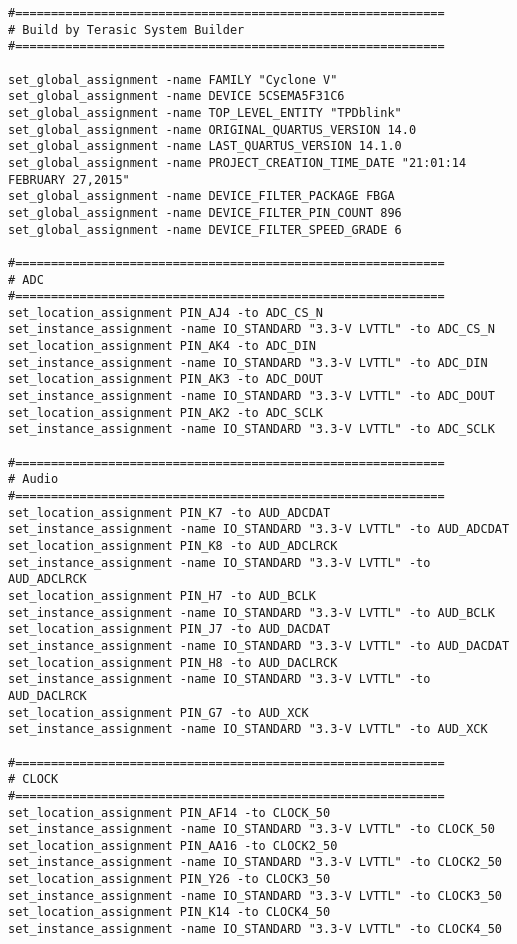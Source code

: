 \begin{verbatim}
#============================================================
# Build by Terasic System Builder
#============================================================

set_global_assignment -name FAMILY "Cyclone V"
set_global_assignment -name DEVICE 5CSEMA5F31C6
set_global_assignment -name TOP_LEVEL_ENTITY "TPDblink"
set_global_assignment -name ORIGINAL_QUARTUS_VERSION 14.0
set_global_assignment -name LAST_QUARTUS_VERSION 14.1.0
set_global_assignment -name PROJECT_CREATION_TIME_DATE "21:01:14 FEBRUARY 27,2015"
set_global_assignment -name DEVICE_FILTER_PACKAGE FBGA
set_global_assignment -name DEVICE_FILTER_PIN_COUNT 896
set_global_assignment -name DEVICE_FILTER_SPEED_GRADE 6

#============================================================
# ADC
#============================================================
set_location_assignment PIN_AJ4 -to ADC_CS_N
set_instance_assignment -name IO_STANDARD "3.3-V LVTTL" -to ADC_CS_N
set_location_assignment PIN_AK4 -to ADC_DIN
set_instance_assignment -name IO_STANDARD "3.3-V LVTTL" -to ADC_DIN
set_location_assignment PIN_AK3 -to ADC_DOUT
set_instance_assignment -name IO_STANDARD "3.3-V LVTTL" -to ADC_DOUT
set_location_assignment PIN_AK2 -to ADC_SCLK
set_instance_assignment -name IO_STANDARD "3.3-V LVTTL" -to ADC_SCLK

#============================================================
# Audio
#============================================================
set_location_assignment PIN_K7 -to AUD_ADCDAT
set_instance_assignment -name IO_STANDARD "3.3-V LVTTL" -to AUD_ADCDAT
set_location_assignment PIN_K8 -to AUD_ADCLRCK
set_instance_assignment -name IO_STANDARD "3.3-V LVTTL" -to AUD_ADCLRCK
set_location_assignment PIN_H7 -to AUD_BCLK
set_instance_assignment -name IO_STANDARD "3.3-V LVTTL" -to AUD_BCLK
set_location_assignment PIN_J7 -to AUD_DACDAT
set_instance_assignment -name IO_STANDARD "3.3-V LVTTL" -to AUD_DACDAT
set_location_assignment PIN_H8 -to AUD_DACLRCK
set_instance_assignment -name IO_STANDARD "3.3-V LVTTL" -to AUD_DACLRCK
set_location_assignment PIN_G7 -to AUD_XCK
set_instance_assignment -name IO_STANDARD "3.3-V LVTTL" -to AUD_XCK

#============================================================
# CLOCK
#============================================================
set_location_assignment PIN_AF14 -to CLOCK_50
set_instance_assignment -name IO_STANDARD "3.3-V LVTTL" -to CLOCK_50
set_location_assignment PIN_AA16 -to CLOCK2_50
set_instance_assignment -name IO_STANDARD "3.3-V LVTTL" -to CLOCK2_50
set_location_assignment PIN_Y26 -to CLOCK3_50
set_instance_assignment -name IO_STANDARD "3.3-V LVTTL" -to CLOCK3_50
set_location_assignment PIN_K14 -to CLOCK4_50
set_instance_assignment -name IO_STANDARD "3.3-V LVTTL" -to CLOCK4_50


\end{verbatim}

